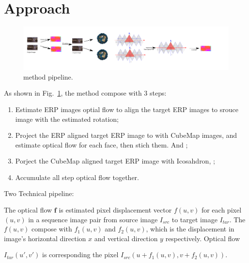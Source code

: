 \section{Approach}\label{sec:approach}

\begin{figure}[hbt!]
	\centering
	\includegraphics[width=0.95\linewidth]{images/method_pipeline_0.pdf}
	\caption{method pipeline. }
\label{fig:approach:pipeline}
\end{figure}



As shown in Fig.~\ref{fig:approach:pipeline}, the method compose with 3 steps:

\begin{enumerate}
	\item Estimate ERP images optial flow to align the target ERP images to srouce image with the estimated rotation;
	\item Project the ERP aligned target ERP image to with CubeMap images, and estimate optical flow for each face, then stich them. And ;
	\item Porject the CubeMap aligned target ERP image with Icosahdron, ;
	\item Accumulate all step optical flow together.
\end{enumerate}

Two Technical pipeline:


The optical flow $\textbf{f}$ is estimated pixel displacement vector $f(u,v)$ for each pixel $(u,v)$ in a sequence image pair from source image $I_{src}$ to target image $I_{tar}$.
The $f(u,v)$ compose with $f_1(u,v)$ and $f_2(u,v)$, which is the displacement in image's horizontal direction $x$ and vertical direction $y$ respectively.
Optical flow 

$I_{tar}(u',v')$ is corresponding the pixel $I_{src}(u + f_1(u,v), v + f_2(u,v))$.


